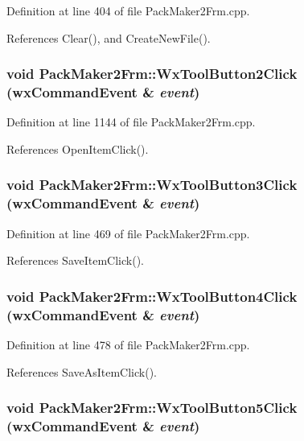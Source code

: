 Definition at line 404 of file Pack\-Maker2Frm.cpp.

References Clear(), and Create\-New\-File().
\subsubsection{\setlength{\rightskip}{0pt plus 5cm}void Pack\-Maker2Frm::Wx\-Tool\-Button2Click (wx\-Command\-Event \& {\em event})}\label{class_pack_maker2_frm_9efab1030f019516427d7727c587a6bc}




Definition at line 1144 of file Pack\-Maker2Frm.cpp.

References Open\-Item\-Click().
\subsubsection{\setlength{\rightskip}{0pt plus 5cm}void Pack\-Maker2Frm::Wx\-Tool\-Button3Click (wx\-Command\-Event \& {\em event})}\label{class_pack_maker2_frm_6322f3694e34e3b41cd3733faa61cd38}




Definition at line 469 of file Pack\-Maker2Frm.cpp.

References Save\-Item\-Click().
\subsubsection{\setlength{\rightskip}{0pt plus 5cm}void Pack\-Maker2Frm::Wx\-Tool\-Button4Click (wx\-Command\-Event \& {\em event})}\label{class_pack_maker2_frm_076b8087b94eb9014185dc74c283455d}




Definition at line 478 of file Pack\-Maker2Frm.cpp.

References Save\-As\-Item\-Click().
\subsubsection{\setlength{\rightskip}{0pt plus 5cm}void Pack\-Maker2Frm::Wx\-Tool\-Button5Click (wx\-Command\-Event \& {\em event})}\label{class_pack_maker2_frm_53fe55ccad7c0a538964346a43fe3de1}




